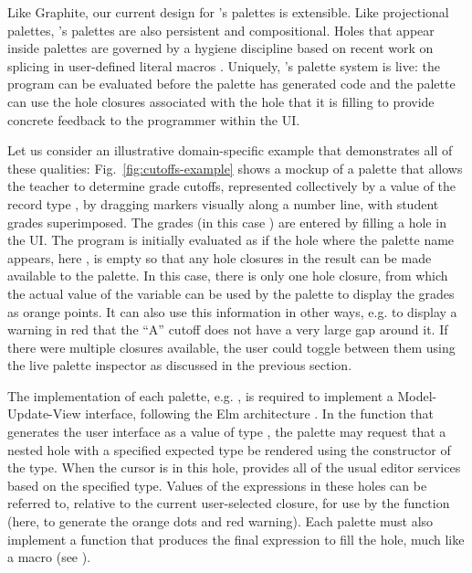 Like Graphite, our current design for \Hazel's palettes is extensible.
Like projectional palettes, \Hazel's palettes are also persistent and compositional. 
Holes that appear inside palettes
are governed by a hygiene discipline based on recent work on splicing in user-defined literal macros
\cite{tlms-icfp18}. 
Uniquely, \Hazel's palette system is live: the program 
can be evaluated before the palette has generated code
and the palette can use the hole closures associated with the hole that it is filling 
to provide concrete feedback to the programmer within the UI.

Let us consider an illustrative domain-specific example that demonstrates
all of these qualities: 
Fig.~\ref{fig:cutoffs-example} shows a mockup of a palette that allows the teacher to determine grade cutoffs, represented collectively by a value of the record type , by dragging markers visually along a number line, with student grades superimposed. The grades (in this case ) are entered by filling a hole in the UI. 
The program is initially evaluated as if the hole where the palette name appears, here , is empty so that 
any hole closures in the result can be made available to the palette. In this case, there is only one hole closure, from which the
actual value of the variable  can be 
used by the palette to display the grades as orange points.
It can also use this information in other ways, e.g. to display a warning in red
that the ``A'' cutoff does not have a very large gap around
it. If there were multiple closures available, the user could
toggle between them using the live palette inspector as discussed in the previous section.

%
The implementation of each palette, e.g. , is required to implement a
Model-Update-View interface, following the Elm architecture \cite{ElmArchitecture}. 
In the  function that generates the user
interface as a value of type , the palette may request that a nested hole with
a specified expected type be rendered using the  constructor of the  type. When the cursor is in this hole, \Hazel provides all of the usual editor services based on the specified type. Values of the expressions in these holes 
can be referred to, relative to the current user-selected closure, for use by the  function (here, to generate the orange dots and red warning). 
Each palette must
also implement a  function that produces the final
expression to fill the hole, much like a macro (see \cite{tlms-icfp18}).

